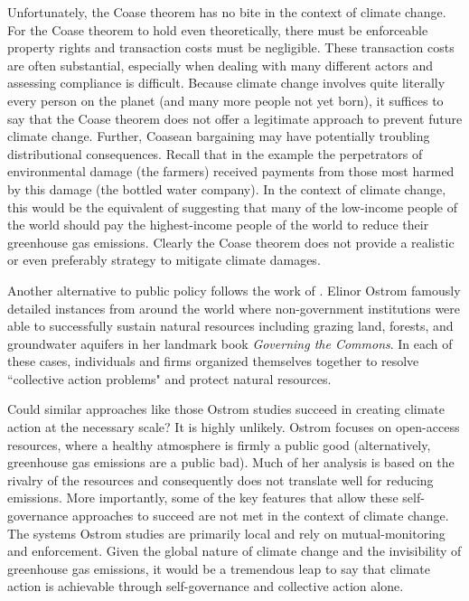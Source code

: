 Unfortunately, the Coase theorem has no bite in the context of climate change. For the Coase theorem to hold even theoretically, there must be enforceable property rights and transaction costs must be negligible. These transaction costs are often substantial, especially when dealing with many different actors and assessing compliance is difficult. Because climate change involves quite literally every person on the planet (and many more people not yet born), it suffices to say that the Coase theorem does not offer a legitimate approach to prevent future climate change. Further, Coasean bargaining may have potentially troubling distributional consequences. Recall that in the example the perpetrators of environmental damage (the farmers) received payments from those most harmed by this damage (the bottled water company). In the context of climate change, this would be the equivalent of suggesting that many of the low-income people of the world should pay the highest-income people of the world to reduce their greenhouse gas emissions. Clearly the Coase theorem does not provide a realistic or even preferably strategy to mitigate climate damages. 

Another alternative to public policy follows the work of \cite{ostrom1990governing}. Elinor Ostrom famously detailed instances from around the world where non-government institutions were able to successfully sustain natural resources including grazing land, forests, and groundwater aquifers in her landmark book \textit{Governing the Commons}. In each of these cases, individuals and firms organized themselves together to resolve ``collective action problems" and protect natural resources. 

Could similar approaches like those Ostrom studies succeed in creating climate action at the necessary scale? It is highly unlikely. Ostrom focuses on open-access resources, where a healthy atmosphere is firmly a public good (alternatively, greenhouse gas emissions are a public bad). Much of her analysis is based on the rivalry of the resources and consequently does not translate well for reducing emissions. More importantly, some of the key features that allow these self-governance approaches to succeed are not met in the context of climate change. The systems Ostrom studies are primarily local and rely on mutual-monitoring and enforcement. Given the global nature of climate change and the invisibility of greenhouse gas emissions, it would be a tremendous leap to say that climate action is achievable through self-governance and collective action alone. 

